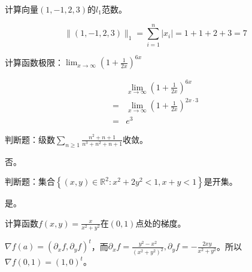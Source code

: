 

\newcommand\Title{2021智能计算数学基础试卷}
\renewcommand\due{due: November 6, 2022}
\newcommand\tr{\operatorname{tr}}




\begin{problem}
	计算向量$(1,-1,2,3)$的$l_1$范数。
\end{problem}
\begin{solution}
	$$\|(1,-1,2,3)\|_1=\sum_{i=1}^n|x_i|=1+1+2+3=7$$
\end{solution}


\begin{problem}
	计算函数极限：$\lim_{x\to \infty}(1+\frac{1}{2x})^{6x}$
\end{problem}
\begin{solution}
	$$\begin{aligned}
		&\lim_{x\to \infty}(1+\frac{1}{2x})^{6x}\\
		=&\lim_{x\to \infty}(1+\frac{1}{2x})^{2x\cdot 3}\\
		=&e^3
	\end{aligned}$$
\end{solution}


\begin{problem}
	判断题：级数$\sum_{n\ge 1}\frac{n^2+n+1}{n^3+n^2+n+1}$收敛。
\end{problem}
\begin{solution}
	否。
\end{solution}


\begin{problem}
	判断题：集合$\left\{(x,y)\in\mathbb{R}^{2}:x^2+2y^2<1,x+y<1\right\}$是开集。
\end{problem}
\begin{solution}
	是。
\end{solution}


\begin{problem}
	计算函数$f(x,y)=\frac{x}{x^2+y^2}$在$(0,1)$点处的梯度。
\end{problem}
\begin{solution}
	$\nabla f(a)=(\partial_xf,\partial_yf)^t$，而$\partial_xf=\frac{y^2-x^2}{(x^2+y^2)^2},\partial_yf=-\frac{2xy}{x^2+y^2}$。所以$\nabla f(0, 1)=\left(1, 0\right)^t$。
\end{solution}


